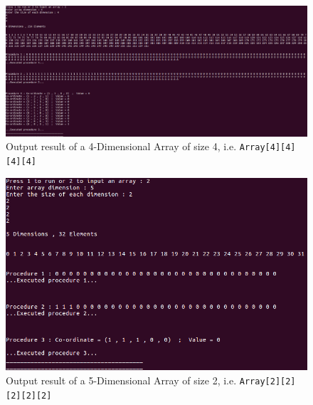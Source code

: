 \documentclass[10pt, conference]{IEEEtran}
\begin{document}
\begin{appendices}
\begin{figure}[h!]
\renewcommand{\thefigure}{\arabic{figure}}
\centering
\includegraphics[scale=0.3]{Result4D.png}
\caption{Output result of a 4-Dimensional Array of size 4, i.e. \texttt{Array[4][4][4][4]} }
\label{Result4D}
\end{figure}

\begin{figure}[h!]
\renewcommand{\thefigure}{\arabic{figure}}
\centering
\includegraphics[scale=0.5]{Result5D.png}
\caption{Output result of a 5-Dimensional Array of size 2, i.e. \texttt{Array[2][2][2][2][2]} }
\label{Result5D}
\end{figure}

\end{appendices}




\end{document}
